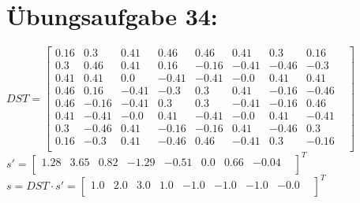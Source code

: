 

	\section*{Übungsaufgabe 34:}

	$
	DST =
	\begin{bmatrix}
	0.16 & 0.3 & 0.41 & 0.46 & 0.46 & 0.41 & 0.3 & 0.16 & \\
	0.3 & 0.46 & 0.41 & 0.16 & -0.16 & -0.41 & -0.46 & -0.3 & \\
	0.41 & 0.41 & 0.0 & -0.41 & -0.41 & -0.0 & 0.41 & 0.41 & \\
	0.46 & 0.16 & -0.41 & -0.3 & 0.3 & 0.41 & -0.16 & -0.46 & \\
	0.46 & -0.16 & -0.41 & 0.3 & 0.3 & -0.41 & -0.16 & 0.46 & \\
	0.41 & -0.41 & -0.0 & 0.41 & -0.41 & -0.0 & 0.41 & -0.41 & \\
	0.3 & -0.46 & 0.41 & -0.16 & -0.16 & 0.41 & -0.46 & 0.3 & \\
	0.16 & -0.3 & 0.41 & -0.46 & 0.46 & -0.41 & 0.3 & -0.16 & \\
	\end{bmatrix}
	$ \\ $
	s' =
	\begin{bmatrix}
	1.28 & 3.65 & 0.82 & -1.29 & -0.51 & 0.0 & 0.66 & -0.04 & \\
	\end{bmatrix}
	^T $ \\ $
	s = DST \cdot s' =
	\begin{bmatrix}
	1.0 & 2.0 & 3.0 & 1.0 & -1.0 & -1.0 & -1.0 & -0.0 & \\
	\end{bmatrix}
	^T $
	
